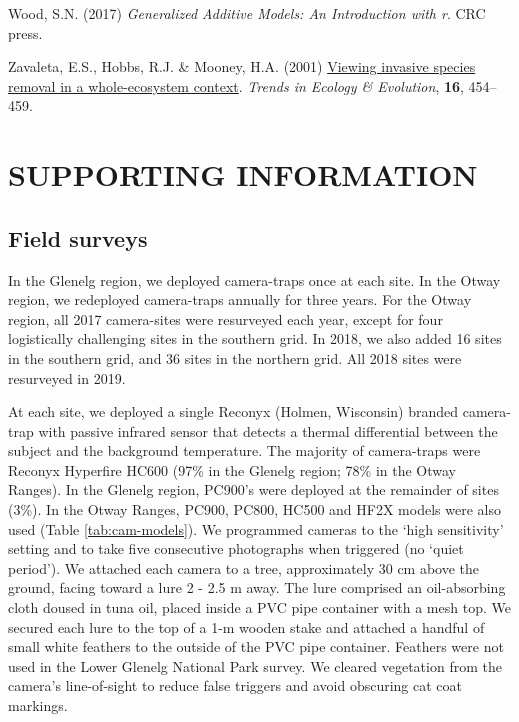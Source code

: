 \documentclass[preprint, 3p, authoryear]{elsarticle} %
\newlength{\cslhangindent}
\newlength{\cslentryspacingunit} %
\newenvironment{CSLReferences}[2] %
 {%
  \setlength{\parindent}{0pt}
  \ifodd #1
  \let\oldpar\par
  \def\par{\hangindent=\cslhangindent\oldpar}
  \fi
  \setlength{\parskip}{#2\cslentryspacingunit}
 }%
 {}
\newcommand{\beginsupplement}{\setcounter{table}{0}  \renewcommand{\thetable}{S\arabic{table}} \setcounter{figure}{0} \renewcommand{\thefigure}{S\arabic{figure}} \setcounter{section}{1} \renewcommand{\thesection}{S\arabic{section}}}
\begin{document}
\begin{CSLReferences}{1}{0}
\leavevmode{}%
Wood, S.N. (2017) \emph{Generalized Additive Models: An Introduction with r}. CRC press.

\leavevmode{}%
Zavaleta, E.S., Hobbs, R.J. \& Mooney, H.A. (2001) \href{https://doi.org/10.1016/S0169-5347(01)02194-2}{Viewing invasive species removal in a whole-ecosystem context}. \emph{Trends in Ecology \& Evolution}, \textbf{16}, 454--459.

\end{CSLReferences}

\newpage
\beginsupplement
\setcounter{page}{1}

\hypertarget{supporting-information}{%
\section*{SUPPORTING INFORMATION}\label{supporting-information}}

\hypertarget{density-app-field}{%
\subsection{Field surveys}\label{density-app-field}}

In the Glenelg region, we deployed camera-traps once at each site. In the Otway region, we redeployed camera-traps annually for three years. For the Otway region, all 2017 camera-sites were resurveyed each year, except for four logistically challenging sites in the southern grid. In 2018, we also added 16 sites in the southern grid, and 36 sites in the northern grid. All 2018 sites were resurveyed in 2019.

At each site, we deployed a single Reconyx (Holmen, Wisconsin) branded camera-trap with passive infrared sensor that detects a thermal differential between the subject and the background temperature. The majority of camera-traps were Reconyx Hyperfire HC600 (97\% in the Glenelg region; 78\% in the Otway Ranges). In the Glenelg region, PC900's were deployed at the remainder of sites (3\%). In the Otway Ranges, PC900, PC800, HC500 and HF2X models were also used (Table \ref{tab:cam-models}). We programmed cameras to the `high sensitivity' setting and to take five consecutive photographs when triggered (no `quiet period'). We attached each camera to a tree, approximately 30 cm above the ground, facing toward a lure 2 - 2.5 m away. The lure comprised an oil-absorbing cloth doused in tuna oil, placed inside a PVC pipe container with a mesh top. We secured each lure to the top of a 1-m wooden stake and attached a handful of small white feathers to the outside of the PVC pipe container. Feathers were not used in the Lower Glenelg National Park survey. We cleared vegetation from the camera's line-of-sight to reduce false triggers and avoid obscuring cat coat markings.
\end{document}
